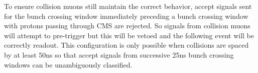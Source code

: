 To ensure collision muons still maintain the correct behavior, accept signals sent for the bunch crossing window immediately
preceding a bunch crossing window with protons passing through CMS are rejected. 
So signals from collision muons will attempt to pre-trigger but this will be vetoed and the following event will be correctly readout.
This configuration is only possible  when collisions are spaced by at least 50ns so that accept signals from successive 25ns
bunch crossing windows can be unambiguously classified.


